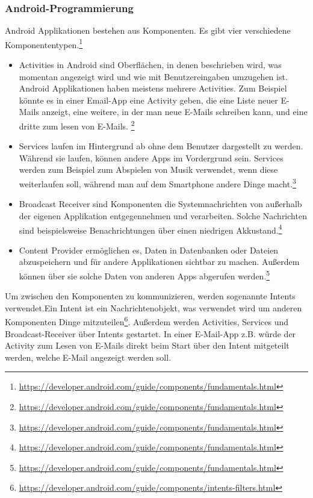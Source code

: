 \documentclass[extern,palatino]{cgBA}
\begin{document}
\subsubsection{Android-Programmierung}Android Applikationen bestehen aus Komponenten. Es gibt vier verschiedene Komponententypen.\footnote{\url{https://developer.android.com/guide/components/fundamentals.html}}
\begin{itemize}
	\item 
	Activities in Android sind Oberflächen, in denen beschrieben wird, was momentan angezeigt wird und wie mit Benutzereingaben umzugehen ist. Android Applikationen haben meistens mehrere Activities. Zum Beispiel könnte es in einer Email-App eine Activity geben, die eine Liste neuer E-Mails anzeigt, eine weitere, in der man neue E-Mails schreiben kann, und eine dritte zum lesen von E-Mails. \footnote{\url{https://developer.android.com/guide/components/fundamentals.html}} 
	\item
	Services laufen im Hintergrund ab ohne dem Benutzer dargestellt zu werden. Während sie laufen, können andere Apps im Vordergrund sein. Services werden zum Beispiel zum  Abspielen von Musik verwendet, wenn diese weiterlaufen soll, während man auf dem Smartphone andere Dinge macht.\footnote{\url{https://developer.android.com/guide/components/fundamentals.html}}
	\item Broadcast Receiver sind Komponenten die Systemnachrichten von außerhalb der eigenen Applikation entgegennehmen und verarbeiten. Solche Nachrichten sind beispielsweise Benachrichtungen über einen niedrigen Akkustand.\footnote{\url{https://developer.android.com/guide/components/fundamentals.html}}
	\item Content Provider ermöglichen es, Daten in Datenbanken oder Dateien abzuspeichern und für andere Applikationen sichtbar zu machen. Außerdem können über sie solche Daten von anderen Apps abgerufen werden.\footnote{\url{https://developer.android.com/guide/components/fundamentals.html}}
\end{itemize}
Um zwischen den Komponenten zu kommunizieren, werden sogenannte Intents verwendet.Ein Intent ist ein Nachrichtenobjekt, was verwendet wird um anderen Komponenten Dinge mitzuteilen\footnote{\url{https://developer.android.com/guide/components/intents-filters.html}}. Außerdem werden Activities, Services und Broadcast-Receiver über Intents gestartet. In einer E-Mail-App z.B. würde der Activity zum Lesen von E-Mails direkt beim Start über den Intent mitgeteilt werden, welche E-Mail angezeigt werden soll.
\end{document}
